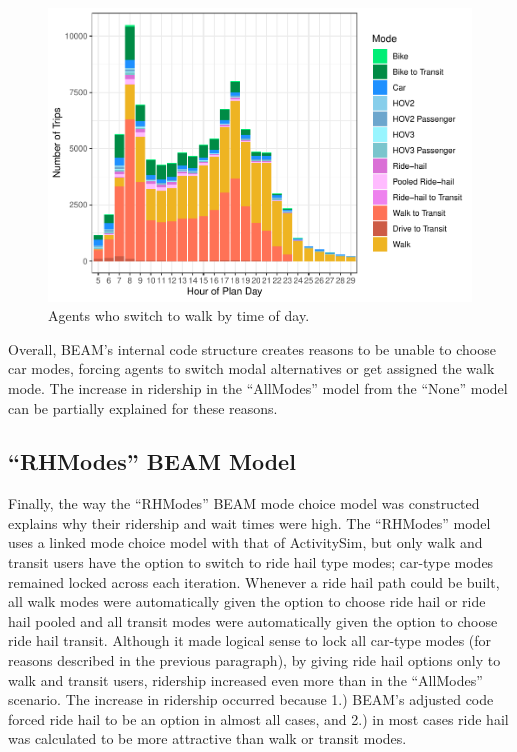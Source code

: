 \documentclass[12pt, oneside, openright]{byuthesis}
\begin{document}
\begin{figure}

{\centering \includegraphics{thesis_files/figure-latex/walkers-1} 

}

\caption{Agents who switch to walk by time of day.}\label{fig:walkers}
\end{figure}

Overall, BEAM's internal code structure creates reasons to be unable to choose car modes, forcing agents to switch modal alternatives or get assigned the walk mode. The increase in ridership in the ``AllModes'' model from the ``None'' model can be partially explained for these reasons.

\hypertarget{rhmodes-beam-model}{%
\subsection{``RHModes'' BEAM Model}\label{rhmodes-beam-model}}

Finally, the way the ``RHModes'' BEAM mode choice model was constructed explains why their ridership and wait times were high. The ``RHModes'' model uses a linked mode choice model with that of ActivitySim, but only walk and transit users have the option to switch to ride hail type modes; car-type modes remained locked across each iteration. Whenever a ride hail path could be built, all walk modes were automatically given the option to choose ride hail or ride hail pooled and all transit modes were automatically given the option to choose ride hail transit. Although it made logical sense to lock all car-type modes (for reasons described in the previous paragraph), by giving ride hail options only to walk and transit users, ridership increased even more than in the ``AllModes'' scenario. The increase in ridership occurred because 1.) BEAM's adjusted code forced ride hail to be an option in almost all cases, and 2.) in most cases ride hail was calculated to be more attractive than walk or transit modes.
\end{document}
